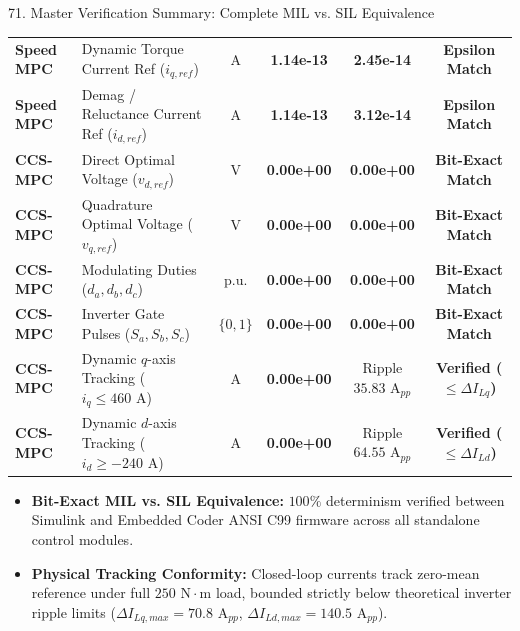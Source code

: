 \documentclass[aspectratio=169]{beamer}
\begin{document}
\begin{frame}{71. Master Verification Summary: Complete MIL vs. SIL Equivalence}
{\begin{tabular}{l l c c c c}
        \rowcolor{blue!5} \textbf{Speed MPC} & Dynamic Torque Current Ref ($i_{q,ref}$) & A & \textbf{1.14e-13} & \textbf{2.45e-14} & \textbf{Epsilon Match} \\
        \textbf{Speed MPC} & Demag / Reluctance Current Ref ($i_{d,ref}$) & A & \textbf{1.14e-13} & \textbf{3.12e-14} & \textbf{Epsilon Match} \\
        \midrule
        \rowcolor{blue!5} \textbf{CCS-MPC} & Direct Optimal Voltage ($v_{d,ref}$) & V & \textbf{0.00e+00} & \textbf{0.00e+00} & \textbf{Bit-Exact Match} \\
        \textbf{CCS-MPC} & Quadrature Optimal Voltage ($v_{q,ref}$) & V & \textbf{0.00e+00} & \textbf{0.00e+00} & \textbf{Bit-Exact Match} \\
        \rowcolor{blue!5} \textbf{CCS-MPC} & Modulating Duties ($d_a, d_b, d_c$) & p.u. & \textbf{0.00e+00} & \textbf{0.00e+00} & \textbf{Bit-Exact Match} \\
        \textbf{CCS-MPC} & Inverter Gate Pulses ($S_a, S_b, S_c$) & $\{0, 1\}$ & \textbf{0.00e+00} & \textbf{0.00e+00} & \textbf{Bit-Exact Match} \\
        \rowcolor{blue!5} \textbf{CCS-MPC} & Dynamic $q$-axis Tracking ($i_q \le 460\text{ A}$) & A & \textbf{0.00e+00} & Ripple $35.83\text{ A}_{pp}$ & \textbf{Verified ($\le \Delta I_{Lq}$)} \\
        \textbf{CCS-MPC} & Dynamic $d$-axis Tracking ($i_d \ge -240\text{ A}$) & A & \textbf{0.00e+00} & Ripple $64.55\text{ A}_{pp}$ & \textbf{Verified ($\le \Delta I_{Ld}$)} \\
        \bottomrule
    \end{tabular}%
    }
    \vspace{1.5mm}
    \begin{itemize}
        \footnotesize
        \setlength{\itemsep}{1.5pt}
        \item \textbf{Bit-Exact MIL vs. SIL Equivalence:} $100\%$ determinism verified between Simulink and Embedded Coder ANSI C99 firmware across all standalone control modules.
        \item \textbf{Physical Tracking Conformity:} Closed-loop currents track zero-mean reference under full $250\text{ N}\cdot\text{m}$ load, bounded strictly below theoretical inverter ripple limits ($\Delta I_{Lq,max} = 70.8\text{ A}_{pp}$, $\Delta I_{Ld,max} = 140.5\text{ A}_{pp}$).
    \end{itemize}
\end{frame}
\end{document}
